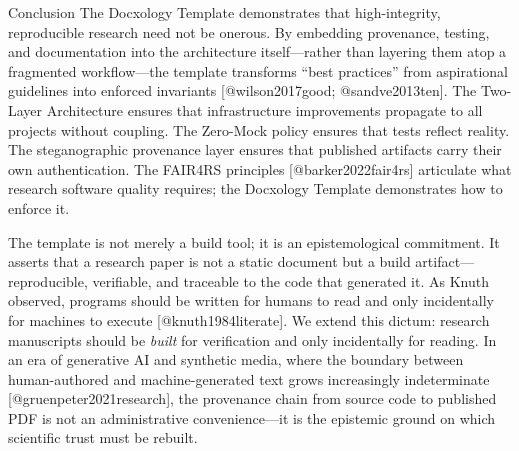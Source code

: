 \documentclass[
  ignorenonframetext,
]{beamer}
\begin{document}
\begin{frame}{Conclusion}
\protect{}\label{conclusion}
The Docxology Template demonstrates that high-integrity, reproducible
research need not be onerous. By embedding provenance, testing, and
documentation into the architecture itself---rather than layering them
atop a fragmented workflow---the template transforms ``best practices''
from aspirational guidelines into enforced invariants
{[}@wilson2017good; @sandve2013ten{]}. The Two-Layer Architecture
ensures that infrastructure improvements propagate to all projects
without coupling. The Zero-Mock policy ensures that tests reflect
reality. The steganographic provenance layer ensures that published
artifacts carry their own authentication. The FAIR4RS principles
{[}@barker2022fair4rs{]} articulate what research software quality
requires; the Docxology Template demonstrates how to enforce it.

The template is not merely a build tool; it is an epistemological
commitment. It asserts that a research paper is not a static document
but a build artifact---reproducible, verifiable, and traceable to the
code that generated it. As Knuth observed, programs should be written
for humans to read and only incidentally for machines to execute
{[}@knuth1984literate{]}. We extend this dictum: research manuscripts
should be \emph{built} for verification and only incidentally for
reading. In an era of generative AI and synthetic media, where the
boundary between human-authored and machine-generated text grows
increasingly indeterminate {[}@gruenpeter2021research{]}, the provenance
chain from source code to published PDF is not an administrative
convenience---it is the epistemic ground on which scientific trust must
be rebuilt.
\end{frame}
\end{document}
